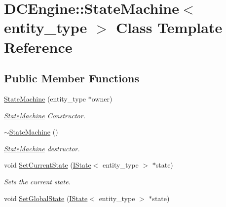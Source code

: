 \hypertarget{classDCEngine_1_1StateMachine}{\section{D\-C\-Engine\-:\-:State\-Machine$<$ entity\-\_\-type $>$ Class Template Reference}
\label{classDCEngine_1_1StateMachine}
}
\subsection*{Public Member Functions}
\begin{DoxyCompactItemize}
\item 
\hypertarget{classDCEngine_1_1StateMachine_a9513b61c28c25a13298a883359c8854d}{\hyperlink{classDCEngine_1_1StateMachine_a9513b61c28c25a13298a883359c8854d}{State\-Machine} (entity\-\_\-type $\ast$owner)}\label{classDCEngine_1_1StateMachine_a9513b61c28c25a13298a883359c8854d}

\begin{DoxyCompactList}\small\item\em \hyperlink{classDCEngine_1_1StateMachine}{State\-Machine} Constructor. \end{DoxyCompactList}\item 
\hypertarget{classDCEngine_1_1StateMachine_a97cb682ab1085dff428dbe66fae2748e}{\hyperlink{classDCEngine_1_1StateMachine_a97cb682ab1085dff428dbe66fae2748e}{$\sim$\-State\-Machine} ()}\label{classDCEngine_1_1StateMachine_a97cb682ab1085dff428dbe66fae2748e}

\begin{DoxyCompactList}\small\item\em \hyperlink{classDCEngine_1_1StateMachine}{State\-Machine} destructor. \end{DoxyCompactList}\item 
\hypertarget{classDCEngine_1_1StateMachine_a798b345be88494a6a8649cb98ab413f8}{void \hyperlink{classDCEngine_1_1StateMachine_a798b345be88494a6a8649cb98ab413f8}{Set\-Current\-State} (\hyperlink{classDCEngine_1_1IState}{I\-State}$<$ entity\-\_\-type $>$ $\ast$state)}\label{classDCEngine_1_1StateMachine_a798b345be88494a6a8649cb98ab413f8}

\begin{DoxyCompactList}\small\item\em Sets the current state. \end{DoxyCompactList}\item 
\hypertarget{classDCEngine_1_1StateMachine_acb8dc8477aeeee273f308355ed318c10}{void \hyperlink{classDCEngine_1_1StateMachine_acb8dc8477aeeee273f308355ed318c10}{Set\-Global\-State} (\hyperlink{classDCEngine_1_1IState}{I\-State}$<$ entity\-\_\-type $>$ $\ast$state)}\label{classDCEngine_1_1StateMachine_acb8dc8477aeeee273f308355ed318c10}


\end{DoxyCompactItemize}
